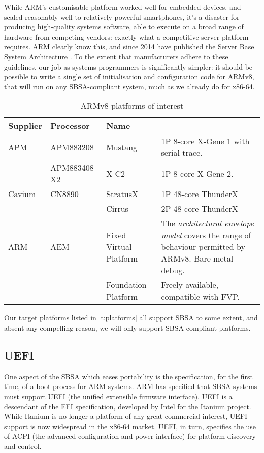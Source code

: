 \documentclass[a4paper,twoside]{report}
\begin{document}
While ARM's customisable platform worked well for embedded devices, and scaled
reasonably well to relatively powerful smartphones, it's a disaster for
producing high-quality systems software, able to execute on a broad range of
hardware from competing vendors: exactly what a competitive server platform
requires. ARM clearly know this, and since 2014 have published the Server Base
System Architecture \citep{arm:sbsa}. To the extent that manufacturers adhere
to these guidelines, our job as systems programmers is significantly simpler:
it should be possible to write a single set of initialisation and
configuration code for ARMv8, that will run on any SBSA-compliant system, much
as we already do for x86-64.

\begin{table}
\begin{center}
\begin{tabular}{lllp{6cm}}
\toprule
Supplier & Processor & Name & \\
\midrule
APM & APM883208 & Mustang  & 1P 8-core X-Gene 1 with serial trace. \\
\addlinespace[2pt]
    & APM883408-X2 & X-C2  & 1P 8-core X-Gene 2. \\
\addlinespace[2pt]
Cavium & CN8890 & StratusX & 1P 48-core ThunderX \\
\addlinespace[2pt]
       &        & Cirrus   & 2P 48-core ThunderX \\
\addlinespace[2pt]
ARM & AEM & Fixed Virtual Platform & The \emph{architectural envelope model}
covers the range of behaviour permitted by ARMv8. Bare-metal debug. \\
\addlinespace[2pt]
    &     & Foundation Platform & Freely available, compatible with FVP. \\
\bottomrule
\end{tabular}
\end{center}
\caption{ARMv8 platforms of interest}\label{t:platforms}
\end{table}

Our target platforms listed in \autoref{t:platforms} all support SBSA to some
extent, and absent any compelling reason, we will only support SBSA-compliant
platforms.

\subsection{UEFI}\label{s:uefi}

One aspect of the SBSA which eases portability is the specification, for the
first time, of a boot process for ARM systems. ARM has specified that SBSA
systems must support UEFI\citet{uefi} (the unified extensible firmware
interface). UEFI is a descendant of the EFI specification, developed by Intel
for the Itanium project. While Itanium is no longer a platform of any great
commercial interest, UEFI support is now widespread in the x86-64 market.
UEFI, in turn, specifies the use of ACPI\citet{acpi} (the advanced
configuration and power interface) for platform discovery and control.
\end{document}
